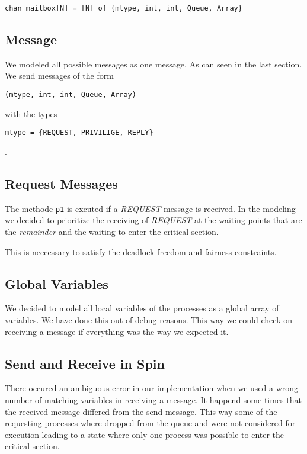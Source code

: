 \documentclass{llncs}
\begin{document}
\begin{lstlisting}
chan mailbox[N] = [N] of {mtype, int, int, Queue, Array}
\end{lstlisting}

\subsection{Message}

We modeled all possible messages as one message. As can seen in
the last section. We send messages of the form
\begin{lstlisting}
(mtype, int, int, Queue, Array)
\end{lstlisting}
with the types
\begin{lstlisting}
mtype = {REQUEST, PRIVILIGE, REPLY}
\end{lstlisting}.

\subsection{Request Messages}

The methode \lstinline|p1| is excuted if a \emph{REQUEST} message is received.
In the modeling we decided to prioritize the receiving of \emph{REQUEST} at the
waiting points that are the \emph{remainder} and the waiting to enter the critical section.

This is neccessary to satisfy the deadlock freedom and fairness constraints.

\subsection{Global Variables}

We decided to model all local variables of the processes as a global array of variables.
We have done this out of debug reasons. This way we could check on receiving a message
if everything was the way we expected it.

\subsection{Send and Receive in Spin}

There occured an ambiguous error in our implementation when we used a wrong number of matching
variables in receiving a message. It happend some times that the received message differed from the
send message. This way some of the requesting processes where dropped from the queue and were not considered
for execution leading to a state where only one process was possible to enter the critical section.
\end{document}

